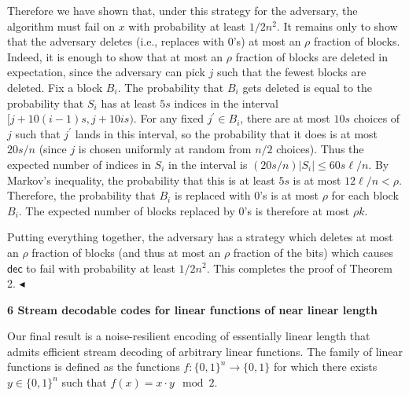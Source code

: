 Therefore we have shown that, under this strategy for the adversary, the algorithm must fail on $x$ with probability at least $1/2n^{2}$. It remains only to show that the adversary deletes (i.e., replaces with $0$’s) at most an $\rho$ fraction of blocks. Indeed, it is enough to show that at most an $\rho$ fraction of blocks are deleted in expectation, since the adversary can pick $j$ such that the fewest blocks are deleted. Fix a block $B_{i}$. The probability that $B_{i}$ gets deleted is equal to the probability that $S_{i}$ has at least $5s$ indices in the interval $[j+10(i-1)s,j+10is)$. For any fixed $j^{\prime}\in B_{i}$, there are at most $10s$ choices of $j$ such that $j^{\prime}$ lands in this interval, so the probability that it does is at most $20s/n$ (since $j$ is chosen uniformly at random from $n/2$ choices). Thus the expected number of indices in $S_{i}$ in the interval is $(20s/n)|S_{i}|\leq 60s\ell/n$. By Markov’s inequality, the probability that this is at least $5s$ is at most $12\ell/n<\rho$. Therefore, the probability that $B_{i}$ is replaced with $0$’s is at most $\rho$ for each block $B_{i}$. The expected number of blocks replaced by $0$’s is therefore at most $\rho k$.\par




Putting everything together, the adversary has a strategy which deletes at most an $\rho$ fraction of blocks (and thus at most an $\rho$ fraction of the bits) which causes $\mathsf{dec}$ to fail with probability at least $1/2n^{2}$. This completes the proof of Theorem 2.
$\blacktriangleleft$\par







\par\medskip\noindent\textbf{
6 Stream decodable codes for linear functions of near linear length}\par




Our final result is a noise-resilient encoding of essentially linear length that admits efficient stream decoding of arbitrary linear functions. The family of linear functions is defined as the functions $f:\{0,1\}^{n}\to\{0,1\}$ for which there exists $y\in\{0,1\}^{n}$ such that $f(x)=x\cdot y\mod 2$.\par






